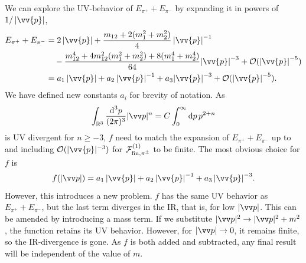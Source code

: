 We can explore the UV-behavior of $E_{\pi^+} + E_{\pi^-}$ by expanding it in powers of $1 / \abs{\vv{p}}$,
%
\begin{align}
    \nonumber
    E_{\pi^+} + E_{\pi^-}
    & = 
    2  \abs{\vv{p}}
    + \frac{m_{12} + 2(m_1^2 + m_2^2)}{4} \, {\abs{\vv{p}}}^{-1}\\\nonumber
    &\quad- \frac{m_{12}^4 + 4 m_{12}^2(m_1^2 + m_2^2) + 8(m_1^4 + m_2^4)}{64}
    {\abs{\vv{p}}}^{-3}
    + \Oh (\abs{\vv{p}}^{-5})
    \\
    & = 
    a_1  \abs{\vv{p}}
    + a_2 \, {\abs{\vv{p}}}^{-1}
    + a_3
    {\abs{\vv{p}}}^{-3}
    + \Oh (\abs{\vv{p}}^{-5}).
\end{align}
%
We have defined new constants $a_i$ for brevity of notation.
As
%
\begin{equation}
    \int_{\R^3} \frac{\dd^3 p}{(2 \pi)^3} |\vv p|^{n}
    = C \int_{0}^\infty \dd p \, p^{2 + n}
\end{equation}
%
is UV divergent for $n \geq -3$, $f$ need to match the expansion of $E_{\pi^+} + E_{\pi^-}$ up to and including $\Oh(|\vv{p}|^{-3})$ for $\mathcal{F}^{(1)}_{\mathrm{fin}, {\pi^\pm} }$ to be finite.
The most obvious choice for $f$ is
%
\begin{equation}
    f(|\vv p|) 
    = a_1  \abs{\vv{p}} + a_2 \, {\abs{\vv{p}}}^{-1} + a_3 \, {\abs{\vv{p}}}^{-3}.
\end{equation}
%
However, this introduces a new problem.
$f$ has the same UV behavior as $E_{\pi^+} + E_{\pi^-}$, but the last term diverges in the IR, that is, for low $|\vv p|$.
This can be amended by introducing a mass term.
If we substitute $|\vv p|^2 \rightarrow |\vv p|^2 + m^2$, the function retains its UV behavior.
However, for $|\vv p| \rightarrow 0$, it remains finite, so the IR-divergence is gone.
As $f$ is both added and subtracted, any final result will be independent of the value of $m$.

